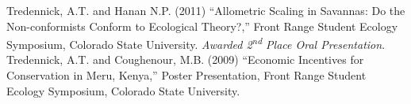 \documentclass[margin,line]{resume}
\begin{document}
\begin{resume}
    Tredennick, A.T. and Hanan N.P. (2011) ``Allometric Scaling in Savannas: Do the Non-conformists Conform to Ecological Theory?,'' Front Range Student Ecology Symposium, Colorado State University. \textsl{Awarded 2\textsuperscript{nd} Place Oral Presentation}.\vspace{-6mm}\\%
  
  Tredennick, A.T. and Coughenour, M.B. (2009) ``Economic Incentives for Conservation in Meru, Kenya,'' Poster Presentation, Front Range Student Ecology Symposium, Colorado State University.

\end{resume}
\end{document}
